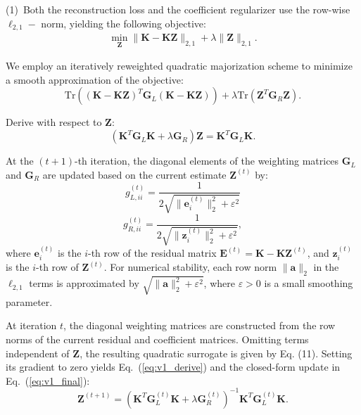 \documentclass[ASNA,twocolumn]{USG} %
\begin{document}
(1)~Both the reconstruction loss and the coefficient regularizer use the row-wise $\ell_{2,1}-$ norm, yielding the following objective:
\begin{eqnarray}\label{Case1}
	\min_{\boldsymbol{Z}}\|\boldsymbol{K}-\boldsymbol{K} \boldsymbol{Z}\|_{2,1}+\lambda\|\boldsymbol{Z}\|_{2,1}.
\end{eqnarray}

We employ an iteratively reweighted quadratic majorization scheme to minimize a smooth approximation of the objective: 
\begin{equation}
    \text{Tr}((\boldsymbol{K}-\boldsymbol{K}\boldsymbol{Z})^T\boldsymbol{G}_L(\boldsymbol{K}-\boldsymbol{K}\boldsymbol{Z})) + \lambda\text{Tr}(\boldsymbol{Z}^T\boldsymbol{G}_R\boldsymbol{Z}).
\end{equation}

Derive with respect to $\boldsymbol{Z}$:
\begin{equation}\label{eq:v1_derive}
    \left(\boldsymbol{K}^T \boldsymbol{G}_L \boldsymbol{K}+\lambda \boldsymbol{G}_R\right) \boldsymbol{Z}=\boldsymbol{K}^T \boldsymbol{G}_L \boldsymbol{K}.
\end{equation}

At the $(t+1)$-th iteration, the diagonal elements of the weighting matrices $\boldsymbol{G}_L$ and $\boldsymbol{G}_R$ are updated based on the current estimate $\boldsymbol{Z}^{(t)}$ by:
\begin{equation}
g_{L,ii}^{(t)} = \frac{1}{2\sqrt{\|\boldsymbol e_i^{(t)}\|_2^2+\varepsilon^2}}
\end{equation}
\begin{equation}
g_{R,ii}^{(t)} = \frac{1}{2\sqrt{\|\boldsymbol{z}_{i}^{(t)}\|_2^2+\varepsilon^2}},
\end{equation}
where $\boldsymbol{e}_i^{(t)}$ is the $i$-th row of the residual matrix $\boldsymbol{E}^{(t)} = \boldsymbol{K} - \boldsymbol{K} \boldsymbol{Z}^{(t)}$, and $\boldsymbol{z}_i^{(t)}$ is the $i$-th row of $\boldsymbol{Z}^{(t)}$. For numerical stability, each row norm $\|\boldsymbol{a}\|_2$ in the $\ell_{2,1}$ terms is approximated by $\sqrt{\|\boldsymbol{a}\|_2^2+\varepsilon^2}$, where $\varepsilon>0$ is a small smoothing parameter.

At iteration $t$, the diagonal weighting matrices are constructed from the row norms of the current residual and coefficient matrices. Omitting terms independent of $\boldsymbol{Z}$, the resulting quadratic surrogate is given by Eq. (11). Setting its gradient to zero yields Eq.~(\ref{eq:v1_derive}) and the closed-form update in Eq.~(\ref{eq:v1_final}):
\begin{equation}\label{eq:v1_final}
    \boldsymbol{Z}^{(t+1)}=\left(\boldsymbol{K}^T \boldsymbol{G}_L^{(t)} \boldsymbol{K}+\lambda \boldsymbol{G}_R^{(t)}\right)^{-1} \boldsymbol{K}^T \boldsymbol{G}_L^{(t)} \boldsymbol{K}.
\end{equation}
\end{document}
